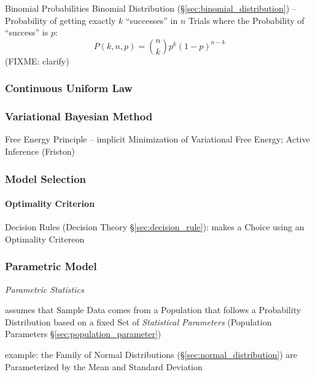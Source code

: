 Binomial Probabilities \fist Binomial Distribution
(\S\ref{sec:binomial_distribution}) -- Probability of getting exactly $k$
``successes'' in $n$ Trials where the Probability of ``success'' is $p$:
\[
  P(k,n,p) = \binom{n}{k}p^k(1-p)^{n-k}
\]
(FIXME: clarify)



\subsubsection{Continuous Uniform Law}\label{sec:continuous_uniform_law}

\subsubsection{Variational Bayesian Method}
\label{sec:variational_bayesian_method}

Free Energy Principle -- implicit Minimization of Variational Free Energy;
Active Inference (Friston)



\subsubsection{Model Selection}\label{sec:model_selection}

\paragraph{Optimality Criterion}\label{sec:optimality_criterion}\hfill

\fist Decision Rules (Decision Theory \S\ref{sec:decision_rule}): makes a
Choice using an Optimality Critereon



\subsubsection{Parametric Model}\label{sec:parametric_model}

\emph{Parametric Statistics}

assumes that Sample Data comes from a Population that follows a Probability
Distribution based on a fixed Set of \emph{Statistical Parameters}
(Population Parameters \S\ref{sec:population_parameter})

example: the Family of Normal Distributions (\S\ref{sec:normal_distribution})
are Parameterized by the Mean and Standard Deviation



